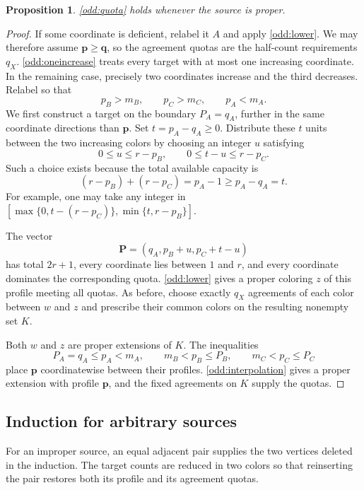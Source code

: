 \documentclass[10pt,a4paper]{amsart}
\numberwithin{equation}{section}
\newtheorem{proposition}[theorem]{Proposition}
\theoremstyle{definition}
\theoremstyle{remark}
\begin{document}
\begin{proposition}\label{odd:proper}
\cref{odd:quota} holds whenever the source is proper.
\end{proposition}
\begin{proof}
If some coordinate is deficient, relabel it $A$ and apply
\cref{odd:lower}. We may therefore assume $\mathbf p\ge\mathbf q$,
so the agreement quotas are the half-count requirements $q_X$.
\cref{odd:oneincrease} treats every target with at most one
increasing coordinate. In the remaining case, precisely two
coordinates increase and the third decreases. Relabel so that
\[
p_B>m_B,\qquad p_C>m_C,\qquad p_A<m_A.
\]
We first construct a target on the boundary $P_A=q_A$, further in
the same coordinate directions than $\mathbf p$.
Set $t=p_A-q_A\ge0$. Distribute these $t$ units between the two
increasing colors by choosing an integer $u$ satisfying
\[
0\le u\le r-p_B,\qquad 0\le t-u\le r-p_C.
\]
Such a choice exists because the total available capacity is
\[
(r-p_B)+(r-p_C)=p_A-1\ge p_A-q_A=t.
\]
For example, one may take any integer in
$[\max\{0,t-(r-p_C)\},\min\{t,r-p_B\}]$.

The vector
\[
\mathbf P=(q_A,p_B+u,p_C+t-u)
\]
has total $2r+1$, every coordinate lies between $1$ and $r$, and
every coordinate dominates the corresponding quota.
\cref{odd:lower} gives a proper coloring $z$ of this profile
meeting all quotas. As before, choose exactly $q_X$ agreements of
each color between $w$ and $z$ and prescribe their common colors
on the resulting nonempty set $K$.

Both $w$ and $z$ are proper extensions of $K$. The inequalities
\[
P_A=q_A\le p_A<m_A,
\qquad m_B<p_B\le P_B,
\qquad m_C<p_C\le P_C
\]
place $\mathbf p$ coordinatewise between their profiles.
\cref{odd:interpolation} gives a proper extension with profile
$\mathbf p$, and the fixed agreements on $K$ supply the quotas.
\end{proof}

\subsection{Induction for arbitrary sources}

For an improper source, an equal adjacent pair supplies the two
vertices deleted in the induction. The target counts are reduced in
two colors so that reinserting the pair restores both its profile and
its agreement quotas.
\end{document}

